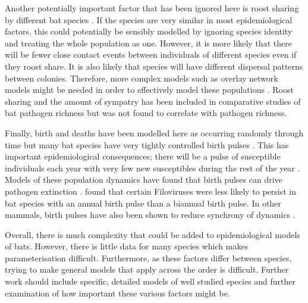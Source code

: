 Another potentially important factor that has been ignored here is roost sharing by different bat species \cite{maganga2014bat, lopez2014seroprevalence, serra2002european, pons2014insights, deThoisy2016bioecological}.
If the species are very similar in most epidemiological factors, this could potentially be sensibly modelled by ignoring species identity and treating the whole population as one.
However, it is more likely that there will be fewer close contact events between individuals of different species even if they roost share.
It is also likely that species will have different dispersal patterns between colonies.
Therefore, more complex models such as overlay network models might be needed in order to effectively model these populations \cite{funk2010interacting, marceau2011modeling}.
Roost sharing and the amount of sympatry has been included in comparative studies of bat pathogen richness \cite{maganga2014bat} but was not found to correlate with pathogen richness.

Finally, birth and deaths have been modelled here as occurring randomly through time but many bat species have very tightly controlled birth pulses \cite{dietrich2015leptospira, george2011host, porter2001birth, greiner2011predictable}.
This has important epidemiological consequences; there will be a pulse of susceptible individuals each year with very few new susceptibles during the rest of the year \cite{dietrich2015leptospira}.
Models of these population dynamics have found that birth pulses can drive pathogen extinction \cite{peel2014effect}.
\textcite{hayman2015biannual} found that certain Filoviruses were less likely to persist in bat species with an annual birth pulse than a biannual birth pulse.
In other mammals, birth pulses have also been shown to reduce synchrony of dynamics \cite{duke2011strong}.

Overall, there is much complexity that could be added to epidemiological models of bats.
However, there is little data for many species which makes parameterisation difficult.
Furthermore, as these factors differ between species, trying to make general models that apply across the order is difficult.
Further work should include specific, detailed models of well studied species and further examination of how important these various factors might be.




